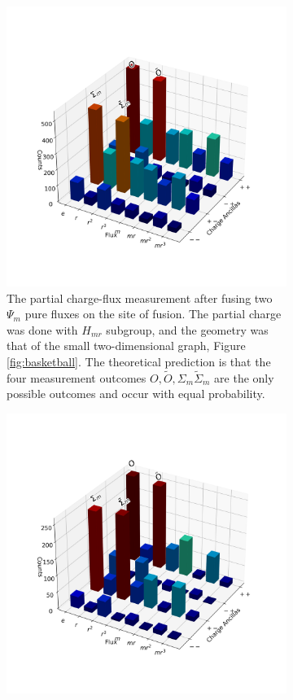 \documentclass[a4paper,twocolumn,11pt]{quantumarticle}
\begin{document}
\begin{figure}
\begin{subfigure}{0.47\textwidth}
    \includegraphics[width=\linewidth]{Figures/fusion_on_basketball.png}
    \caption{The partial charge-flux measurement after fusing two $\Psi_m$ pure fluxes on the site of fusion. The partial charge was done with $H_{mr}$ subgroup, and the geometry was that of the small two-dimensional graph, Figure \ref{fig:basketball}. The theoretical prediction is that the four measurement outcomes $O,\tilde O,\Sigma_m \tilde{\Sigma}_m$ are the only possible outcomes and occur with equal probability.}
    \label{fig:fusion_basketball}
\end{subfigure}
\vspace{15pt}
\begin{subfigure}{0.47\textwidth}
    \includegraphics[width=\linewidth]{Figures/braid_fusion.png}

\end{subfigure}
\end{figure}
\end{document}
